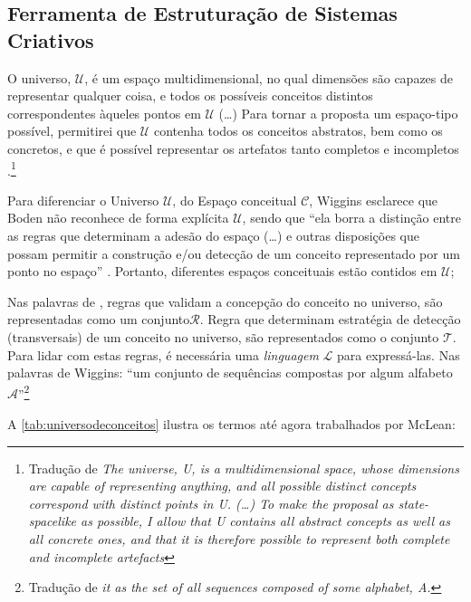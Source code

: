 \subsection{Ferramenta de Estruturação de Sistemas Criativos}\label{sec:csf}

\begin{citacao}
O universo, $\mathcal{U}$, é um espaço multidimensional, no qual dimensões são capazes de representar qualquer coisa, e todos os possíveis conceitos distintos correspondentes àqueles pontos em $\mathcal{U}$ (\ldots) Para tornar a proposta um espaço-tipo possível, permitirei que $\mathcal{U}$ contenha todos os conceitos abstratos, bem como os concretos, e que é possível representar os artefatos tanto completos e incompletos \cite[p.~451]{wiggins_framework_2006}.\footnote{Tradução de \emph{The universe, U, is a multidimensional space, whose dimensions are capable of representing anything, and all possible distinct concepts correspond with distinct points in U. (\ldots) To make the proposal as state-spacelike as possible, I allow that U contains all abstract concepts as well as all concrete ones, and that it is therefore possible to represent both complete and incomplete artefacts}}
\end{citacao}

Para diferenciar o Universo $\mathcal{U}$, do Espaço conceitual $\mathcal{C}$, Wiggins esclarece que Boden não reconhece de forma explícita $\mathcal{U}$, sendo que ``ela borra a distinção entre as regras que determinam a adesão do espaço (\ldots) e outras disposições que possam permitir a construção e/ou detecção de um conceito representado por um ponto no espaço'' \cite[p.~451]{wiggins_framework_2006}. Portanto, diferentes espaços conceituais estão contidos em $\mathcal{U}$;

Nas palavras de , regras que validam a concepção do conceito no universo, são representadas como um conjunto$\mathcal{R}$. Regra que determinam estratégia de detecção (transversais) de um conceito no universo, são representados como o conjunto $\mathcal{T}$. Para lidar com estas regras, é necessária uma \emph{linguagem} $\mathcal{L}$ para expressá-las. Nas palavras de Wiggins: ``um conjunto de sequências compostas por algum alfabeto $\mathcal{A}$''\footnote{Tradução de \emph{it as the set of all sequences composed of some alphabet, A.}}

A \autoref{tab:universodeconceitos} ilustra os termos até agora trabalhados por McLean:


